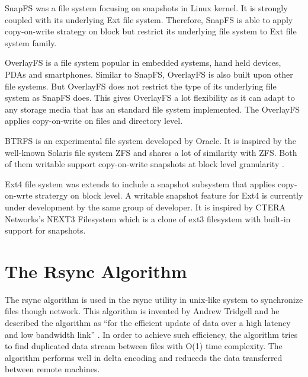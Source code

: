     SnapFS was a file system focusing on snapshots in Linux kernel. \cite{snapfs} It is strongly coupled with its underlying Ext file system. Therefore, SnapFS is able to apply copy-on-write strategy on block but restrict its underlying file system to Ext file system family. 
    
    OverlayFS \cite{overlayfs} is a file system popular in embedded systems, hand held devices, PDAs and smartphones. Similar to SnapFS, OverlayFS is also built upon other file systems. But OverlayFS does not restrict the type of its underlying file system as SnapFS does. This gives OverlayFS a lot flexibility as it can adapt to any storage media that has an standard file system implemented. The OverlayFS applies copy-on-write on files and directory level.

    BTRFS \cite{btrfs} is an experimental file system developed by Oracle. It is inspired by the well-known Solaris file system ZFS and shares a lot of similarity with ZFS. Both of them writable support copy-on-write snapshots at block level granularity \cite{btrfscow}.
    
    Ext4 file system was extends to include a snapshot subsystem that applies copy-on-wrte stratergy on block level. A writable snapshot feature for Ext4 is currently under development by the same group of developer.\cite{ext4snap} It is inspired by CTERA Networks's NEXT3 Filesystem which is a clone of ext3 filesystem with built-in support for snapshots.

\section{The Rsync Algorithm}
    
    The rsync algorithm is used in the rsync utility in unix-like system to synchronize files though network. This algorithm is invented by Andrew Tridgell and he described the algorithm as ``for the efficient update of data over a high latency and low bandwidth link'' \cite{rsync_alg}. In order to achieve such efficiency, the algorithm tries to find duplicated data stream between files with O(1) time complexity. The algorithm performs well in delta encoding and reduceds the data transferred between remote machines.
